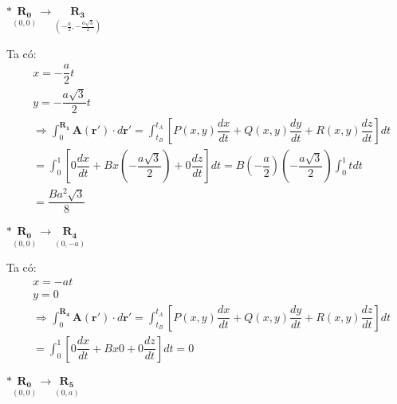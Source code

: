 \documentclass{article}
\begin{document}
\noindent $\ast \underset{(0,0)}{\mathbf{R_0}}  \longrightarrow \underset{(-\frac{a}{2},-\frac{a\sqrt{3}}{2})}{\mathbf{R_3}}$

Ta có:
\begin{align}
     & x = -\dfrac{a}{2}t \nonumber                                                                                                                                                                            \\
     & y = -\dfrac{a\sqrt{3}}{2}t \nonumber                                                                                                                                                                    \\
     & \Rightarrow \int_{0}^{\mathbf{R_1}} \mathbf{A}(\mathbf{r'})\cdot d\mathbf{r'} =  \int_{t_B}^{t_A} \left[ P(x,y)\dfrac{dx}{dt} + Q(x,y)\dfrac{dy}{dt} + R(x,y)\dfrac{dz}{dt} \right] dt \nonumber        \\
     & = \int_{0}^{1} \left[ 0\dfrac{dx}{dt} + Bx\left(-\dfrac{a\sqrt{3}}{2}\right) + 0\dfrac{dz}{dt} \right] dt = B \left( -\dfrac{a}{2}\right)\left(-\dfrac{a\sqrt{3}}{2}\right) \int_{0}^{1}t dt  \nonumber \\
     & = \dfrac{Ba^2\sqrt{3}}{8} \nonumber
\end{align}

\clearpage

\noindent $\ast \underset{(0,0)}{\mathbf{R_0}}  \longrightarrow \underset{(0,-a)}{\mathbf{R_4}}$

Ta có:
\begin{align}
     & x = - at \nonumber                                                                                                                                                                               \\
     & y = 0 \nonumber                                                                                                                                                                                  \\
     & \Rightarrow \int_{0}^{\mathbf{R_4}} \mathbf{A}(\mathbf{r'})\cdot d\mathbf{r'} =  \int_{t_B}^{t_A} \left[ P(x,y)\dfrac{dx}{dt} + Q(x,y)\dfrac{dy}{dt} + R(x,y)\dfrac{dz}{dt} \right] dt \nonumber \\
     & = \int_{0}^{1} \left[ 0\dfrac{dx}{dt} + Bx0 + 0\dfrac{dz}{dt} \right] dt = 0 \nonumber
\end{align}

\noindent $\ast \underset{(0,0)}{\mathbf{R_0}}  \longrightarrow \underset{(0,a)}{\mathbf{R_5}}$
\end{document}

